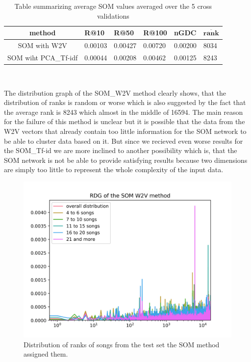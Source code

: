 \begin{table}[h]
\centering
\renewcommand{\arraystretch}{1.5}
\begin{tabu} to 1\textwidth { | c || X[c] | X[c] | X[c] | X[c] | X[c] |}
 \hline
 \textbf{method} & \textbf{R@10} & \textbf{R@50} & \textbf{R@100} & \textbf{nGDC} & $ \boldsymbol{\overline{rank}} $ \\
 \hline
 \hline
 SOM with W2V & 0.00103 & 0.00427 & 0.00720 & 0.00200 & 8034 \\
 \hline
 SOM wiht PCA\_Tf-idf & 0.00044 & 0.00208 & 0.00462 & 0.00125 & 8243 \\
 \hline
\end{tabu} \\
\caption{Table summarizing average SOM values averaged over the 5 cross validations}
\label{table:som}
\end{table}
The distribution graph of the SOM\_W2V method clearly shows, that the distribution of ranks is random or worse which is also suggested by the fact that the average rank is 8243 which almost in the middle of 16594. The main reason for the failure of this method is unclear but it is possible that the data from the W2V vectors that already contain too little information for the SOM network to be able to cluster data based on it.  But since we recieved even worse results for the SOM\_Tf-id we are more inclined to another possibility which is, that the SOM network is not be able to provide satisfying results because two dimensions are simply too little to represent the whole complexity of the input data.
\begin{figure}[h]
    \centering
	\includegraphics[width=120mm]{./img/som_w2v_graph.png}
	\caption{Distribution of ranks of songs from the test set the SOM method assigned them.}
	\label{fig:som_distribution}
\end{figure}
